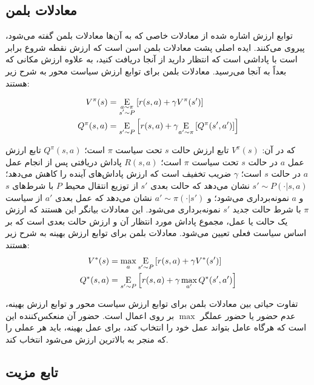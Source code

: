   \subsection{ معادلات بلمن}
   
   توابع ارزش اشاره شده از معادلات خاصی که به آن‌ها معادلات بلمن گفته می‌شود، پیروی می‌کنند. ایده اصلی پشت معادلات بلمن اسن است که
   ارزش نقطه شروع برابر است با پاداشی است که انتظار دارید از آنجا دریافت کنید، به علاوه ارزش مکانی که بعداً به آنجا می‌رسید.
   معادلات بلمن برای توابع ارزش سیاست محور به شرح زیر هستند:
  
  \begin{align*}
  	V^{\pi}(s) &=  \underset{\substack{a \sim \pi \\ s'\sim P}}{\mathrm{E}} 
  	\left[
  	{r(s,a) + \gamma V^{\pi}(s')}
  	\right] \\
  	  	Q^{\pi}(s,a) &= \underset{s'\sim P}{\mathrm{E}}
  	  	\left[
  	  	{r(s,a) + \gamma \underset{a'\sim \pi}{\mathrm{E}}\left[
  	  		{Q^{\pi}(s',a')}
  	  		\right]
  	  	}
  	  	\right]
  \end{align*}
  
  که در آن: \( V^\pi(s) \) تابع ارزش حالت \( s \) تحت سیاست \( \pi \) است؛ \( Q^\pi(s,a) \) تابع ارزش عمل \( a \) در حالت \( s \) تحت سیاست \( \pi \) است؛ \( R(s,a) \) پاداش دریافتی پس از انجام عمل \( a \) در حالت \( s \) است؛ \( \gamma \) ضریب تخفیف است که ارزش پاداش‌های آینده را کاهش می‌دهد؛ \( s' \sim P(\cdot|s,a) \) نشان می‌دهد که حالت بعدی \( s' \) از توزیع انتقال محیط \( P \) با شرط‌های \( s \) و \( a \) نمونه‌برداری می‌شود؛ و \( a' \sim \pi(\cdot|s') \) نشان می‌دهد که عمل بعدی \( a' \) از سیاست \( \pi \) با شرط حالت جدید \( s' \) نمونه‌برداری می‌شود.
  این معادلات بیانگر این هستند که ارزش یک حالت یا عمل، مجموع پاداش مورد انتظار آن و ارزش حالت بعدی است که بر اساس سیاست فعلی تعیین می‌شود.
  معادلات بلمن برای توابع ارزش بهینه به شرح زیر هستند:
\begin{align*}
	V^*(s) &= \max_a \underset{s'\sim P}{\mathrm{E}}\left[
	{r(s,a) + \gamma V^*(s')}\right] \\
	Q^*(s,a) &= \underset{s'\sim P}{\mathrm{E}}\left[
	{r(s,a) + \gamma \max_{a'} Q^*(s',a')}\right]
\end{align*}
  
  تفاوت حیاتی بین معادلات بلمن برای توابع ارزش سیاست محور و توابع ارزش بهینه، عدم حضور یا حضور عملگر \(\max\) بر روی اعمال است. حضور آن منعکس‌کننده این است که هرگاه عامل بتواند عمل خود را انتخاب کند، برای عمل بهینه، باید هر عملی را که منجر به بالاترین ارزش می‌شود انتخاب کند.
  
  
  \subsection{تابع مزیت}
  
